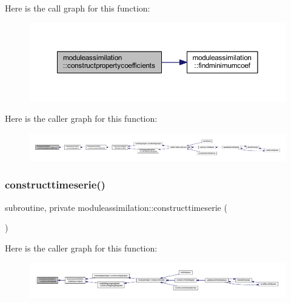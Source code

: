 Here is the call graph for this function\+:\nopagebreak
\begin{figure}[H]
\begin{center}
\leavevmode
\includegraphics[width=350pt]{namespacemoduleassimilation_a1af2e006a02d8457d8516853b6a03307_cgraph}
\end{center}
\end{figure}
Here is the caller graph for this function\+:\nopagebreak
\begin{figure}[H]
\begin{center}
\leavevmode
\includegraphics[width=350pt]{namespacemoduleassimilation_a1af2e006a02d8457d8516853b6a03307_icgraph}
\end{center}
\end{figure}
\mbox{\label{namespacemoduleassimilation_ac14668590d74858a7daa3e19238d2a79}} 
\subsubsection{\texorpdfstring{constructtimeserie()}{constructtimeserie()}}
{\footnotesize\ttfamily subroutine, private moduleassimilation\+::constructtimeserie (\begin{DoxyParamCaption}{ }\end{DoxyParamCaption})\hspace{0.3cm}{\ttfamily [private]}}

Here is the caller graph for this function\+:\nopagebreak
\begin{figure}[H]
\begin{center}
\leavevmode
\includegraphics[width=350pt]{namespacemoduleassimilation_ac14668590d74858a7daa3e19238d2a79_icgraph}
\end{center}
\end{figure}
\mbox{\label{namespacemoduleassimilation_a90d72337a9f9a14b03745d53d1bb201f}} 

